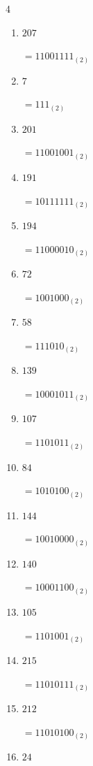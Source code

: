 \begin{multicols}{4}
\begin{enumerate}
        $=1000_{(2)}$

\columnbreak %

  \item $207$

        $=11001111_{(2)}$

  \item $7$

        $=111_{(2)}$

  \item $201$

        $=11001001_{(2)}$

  \item $191$

        $=10111111_{(2)}$

  \item $194$

        $=11000010_{(2)}$

  \item $72$

        $=1001000_{(2)}$

  \item $58$

        $=111010_{(2)}$

  \item $139$

        $=10001011_{(2)}$

  \item $107$

        $=1101011_{(2)}$

  \item $84$

        $=1010100_{(2)}$

  \item $144$

        $=10010000_{(2)}$

  \item $140$

        $=10001100_{(2)}$

  \item $105$

        $=1101001_{(2)}$

  \item $215$

        $=11010111_{(2)}$

  \item $212$

        $=11010100_{(2)}$

\columnbreak %

  \item $24$


\end{enumerate}
\end{multicols}
